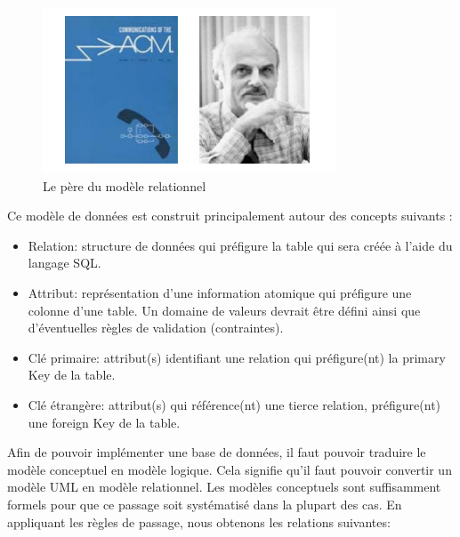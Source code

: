 \begin{figure}[h!]
    \centering
    \includegraphics[scale=1]{images/pere_mr.PNG}
    \caption{Le père du modèle relationnel}
    \label{fig48}
\end{figure}
        
Ce modèle de données est construit principalement autour des concepts suivants \cite{11}:

\begin{itemize}
    \item[\textbullet] Relation: structure de données qui préfigure la table qui 
        sera créée à l’aide du langage SQL.
    \item[\textbullet]  Attribut: représentation d’une information atomique qui 
        préfigure une colonne d’une table. Un domaine de valeurs devrait être défini 
        ainsi que d’éventuelles règles de validation (contraintes).
    \item[\textbullet] Clé primaire: attribut(s) identifiant une relation qui 
        préfigure(nt) la primary Key de la table.
    \item[\textbullet] Clé étrangère: attribut(s) qui référence(nt) une tierce 
        relation, préfigure(nt) une foreign Key de la table.             
\end{itemize}

Afin de pouvoir implémenter une base de données, il faut pouvoir traduire le 
modèle conceptuel en modèle logique. Cela signifie qu’il faut pouvoir convertir 
un modèle UML en modèle relationnel. Les modèles conceptuels sont suffisamment 
formels pour que ce passage soit systématisé dans la plupart des cas. 
En appliquant les règles de passage\cite{12}, nous obtenons les relations suivantes:

